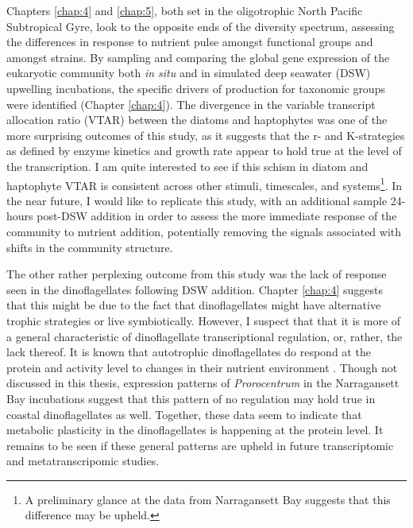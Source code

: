 \par
Chapters \ref{chap:4} and \ref{chap:5}, both set in the oligotrophic North Pacific Subtropical Gyre, look to the opposite ends of the diversity spectrum, assessing the differences in response to nutrient pulse amongst functional groups and amongst strains. By sampling and comparing the global gene expression of the eukaryotic community both \textit{in situ} and in simulated deep seawater (DSW) upwelling incubations, the specific drivers of production for taxonomic groups were identified (Chapter \ref{chap:4}). The divergence in the variable transcript allocation ratio (VTAR) between the diatoms and haptophytes was one of the more surprising outcomes of this study, as it suggests that the r- and K-strategies as defined by enzyme kinetics and growth rate appear to hold true at the level of the transcription. I am quite interested to see if this schism in diatom and haptophyte VTAR is consistent across other stimuli, timescales, and systems\footnote{A preliminary glance at the data from Narragansett Bay suggests that this difference may be upheld.}. In the near future, I would like to replicate this study, with an additional sample 24-hours post-DSW addition in order to assess the more immediate response of the community to nutrient addition, potentially removing the signals associated with shifts in the community structure. 
\par
The other rather perplexing outcome from this study was the lack of response seen in the dinoflagellates following DSW addition. Chapter \ref{chap:4} suggests that this might be due to the fact that dinoflagellates might have alternative trophic strategies or live symbiotically. However, I suspect that that it is more of a general characteristic of dinoflagellate transcriptional regulation, or, rather, the lack thereof. It is known that autotrophic dinoflagellates do respond at the protein and activity level to changes in their nutrient environment \citep{Dyhrman1999}. Though not discussed in this thesis, expression patterns of \textit{Prorocentrum} in the Narragansett Bay incubations suggest that this pattern of no regulation may hold true in coastal dinoflagellates as well. Together, these data seem to indicate that metabolic plasticity in the dinoflagellates is happening at the protein level. It remains to be seen if these general patterns are upheld in future transcriptomic and metatranscripomic studies. 
\par
